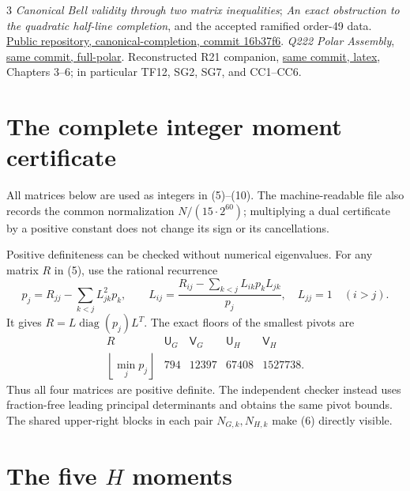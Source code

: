 \documentclass[10pt]{article}
\begin{document}
\begin{thebibliography}{3}\small
{} \emph{Canonical Bell validity through two matrix inequalities};
\emph{An exact obstruction to the quadratic half-line completion},
and the accepted ramified order-49 data.
\href{https://github.com/anubhav70747/q222-finite-sdp/tree/16b37f6deb198fa48134145b4d12b7cc7d37be36/extracted-lifts/canonical-completion}{Public repository, canonical-completion, commit 16b37f6}.
 \emph{Q222 Polar Assembly},
\href{https://github.com/anubhav70747/q222-finite-sdp/tree/16b37f6deb198fa48134145b4d12b7cc7d37be36/extracted-lifts/canonical-completion/full-polar}{same commit, full-polar}.
 Reconstructed R21 companion,
\href{https://github.com/anubhav70747/q222-finite-sdp/tree/16b37f6deb198fa48134145b4d12b7cc7d37be36/latex}{same commit, latex},
Chapters 3--6; in particular TF12, SG2, SG7, and CC1--CC6.
\end{thebibliography}

\clearpage
\appendix
\section{The complete integer moment certificate}\label{app:data}
All matrices below are used as integers in (5)--(10).
The machine-readable file also records the common normalization
$N/(15\cdot2^{60})$; multiplying a dual certificate by a positive
constant does not change its sign or its cancellations.

Positive definiteness can be checked without numerical eigenvalues.
For any matrix $R$ in (5), use the rational recurrence
\[
 p_j=R_{jj}-\sum_{k<j}L_{jk}^2p_k,\qquad
 L_{ij}=\frac{R_{ij}-\sum_{k<j}L_{ik}p_kL_{jk}}{p_j},
 \quad L_{jj}=1\quad(i>j).
\]
It gives $R=L\operatorname{diag}(p_j)L^T$. The exact floors of the
smallest pivots are
\[
\begin{array}{c|rrrr}
 R&\mathsf U_G&\mathsf V_G&\mathsf U_H&\mathsf V_H\\\hline
 \left\lfloor\min_jp_j\right\rfloor&794&12397&67408&1527738.
\end{array}
\]
Thus all four matrices are positive definite. The independent checker
instead uses fraction-free leading principal determinants and obtains
the same pivot bounds. The shared upper-right blocks in each pair
$N_{G,k},N_{H,k}$ make (6) directly visible.


\clearpage
\section*{The five $H$ moments}

\end{document}
